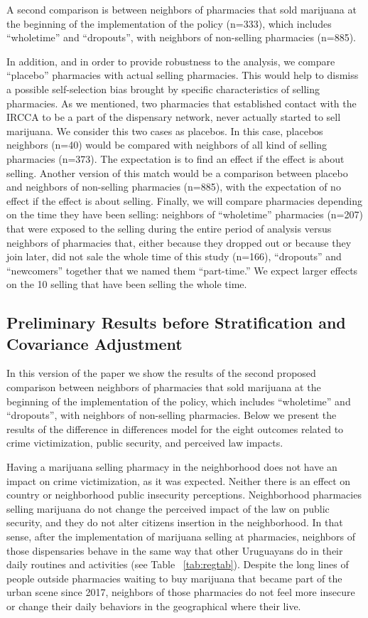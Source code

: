 \documentclass[11pt]{article}
\begin{document}
A second comparison is between neighbors of pharmacies that sold marijuana at the beginning of the implementation of the policy (n=333), which includes ``wholetime'' and ``dropouts'', with neighbors of non-selling pharmacies (n=885).

In addition, and in order to provide robustness to the analysis, we compare ``placebo'' pharmacies with actual selling pharmacies. This would help to dismiss a possible self-selection bias brought by specific characteristics of selling pharmacies. As we mentioned, two pharmacies that established contact with the IRCCA to be a part of the dispensary network, never actually started to sell marijuana. We consider this two cases as placebos. In this case, placebos neighbors (n=40) would be compared with neighbors of all kind of selling pharmacies (n=373). The expectation is to find an effect if the effect is about selling. Another version of this match would be a comparison between placebo and neighbors of non-selling pharmacies (n=885), with the expectation of no effect if the effect is about selling.
Finally, we will compare pharmacies depending on the time they have been selling: neighbors of ``wholetime'' pharmacies (n=207) that were exposed to the selling during the entire period of analysis versus neighbors of pharmacies that, either because they dropped out or because they join later, did not sale the whole time of this study (n=166), ``dropouts'' and ``newcomers'' together that we named them ``part-time.'' We expect larger effects on the 10 selling that have been selling the whole time.

\subsection{Preliminary Results before Stratification and Covariance Adjustment}
In this version of the paper we show the results of the second proposed comparison between neighbors of pharmacies that sold marijuana at the beginning of the implementation of the policy, which includes ``wholetime'' and ``dropouts'', with neighbors of non-selling pharmacies. Below we present the results of the difference in differences model for the eight outcomes related to crime victimization, public security, and perceived law impacts.

Having a marijuana selling pharmacy in the neighborhood does not have an impact on crime victimization, as it was expected. Neither there is an effect on country or neighborhood public insecurity perceptions. Neighborhood pharmacies selling marijuana do not change the perceived impact of the law on public security, and they do not alter citizens insertion in the neighborhood. In that sense, after the implementation of marijuana selling at pharmacies, neighbors of those dispensaries behave in the same way that other Uruguayans do in their daily routines and activities (see Table ~\ref{tab:regtab}). Despite the long lines of people outside pharmacies waiting to buy marijuana that became part of the urban scene since 2017, neighbors of those pharmacies do not feel more insecure or change their daily behaviors in the geographical where their live.
\end{document}
